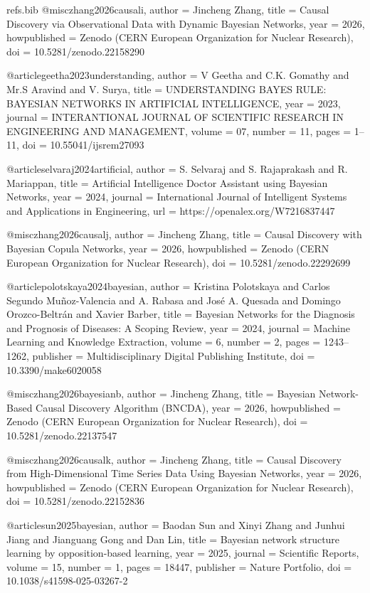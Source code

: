 \begin{filecontents*}[overwrite]{refs.bib}
@misc{zhang2026causali,
  author = {Jincheng Zhang},
  title = {{Causal Discovery via Observational Data with Dynamic Bayesian Networks}},
  year = {2026},
  howpublished = {Zenodo (CERN European Organization for Nuclear Research)},
  doi = {10.5281/zenodo.22158290}
}

@article{geetha2023understanding,
  author = {V Geetha and C.K. Gomathy and Mr.S Aravind and V. Surya},
  title = {{UNDERSTANDING BAYES RULE: BAYESIAN NETWORKS IN ARTIFICIAL INTELLIGENCE}},
  year = {2023},
  journal = {INTERANTIONAL JOURNAL OF SCIENTIFIC RESEARCH IN ENGINEERING AND MANAGEMENT},
  volume = {07},
  number = {11},
  pages = {1--11},
  doi = {10.55041/ijsrem27093}
}

@article{selvaraj2024artificial,
  author = {S. Selvaraj and S. Rajaprakash and R. Mariappan},
  title = {{Artificial Intelligence Doctor Assistant using Bayesian Networks}},
  year = {2024},
  journal = {International Journal of Intelligent Systems and Applications in Engineering},
  url = {https://openalex.org/W7216837447}
}

@misc{zhang2026causalj,
  author = {Jincheng Zhang},
  title = {{Causal Discovery with Bayesian Copula Networks}},
  year = {2026},
  howpublished = {Zenodo (CERN European Organization for Nuclear Research)},
  doi = {10.5281/zenodo.22292699}
}

@article{polotskaya2024bayesian,
  author = {Kristina Polotskaya and Carlos Segundo Mu{\~n}oz-Valencia and A. Rabasa and Jos{\'e} A. Quesada and Domingo Orozco{-}Beltr{\'a}n and Xavier Barber},
  title = {{Bayesian Networks for the Diagnosis and Prognosis of Diseases: A Scoping Review}},
  year = {2024},
  journal = {Machine Learning and Knowledge Extraction},
  volume = {6},
  number = {2},
  pages = {1243--1262},
  publisher = {Multidisciplinary Digital Publishing Institute},
  doi = {10.3390/make6020058}
}

@misc{zhang2026bayesianb,
  author = {Jincheng Zhang},
  title = {{Bayesian Network-Based Causal Discovery Algorithm (BNCDA)}},
  year = {2026},
  howpublished = {Zenodo (CERN European Organization for Nuclear Research)},
  doi = {10.5281/zenodo.22137547}
}

@misc{zhang2026causalk,
  author = {Jincheng Zhang},
  title = {{Causal Discovery from High-Dimensional Time Series Data Using Bayesian Networks}},
  year = {2026},
  howpublished = {Zenodo (CERN European Organization for Nuclear Research)},
  doi = {10.5281/zenodo.22152836}
}

@article{sun2025bayesian,
  author = {Baodan Sun and Xinyi Zhang and Junhui Jiang and Jianguang Gong and Dan Lin},
  title = {{Bayesian network structure learning by opposition-based learning}},
  year = {2025},
  journal = {Scientific Reports},
  volume = {15},
  number = {1},
  pages = {18447},
  publisher = {Nature Portfolio},
  doi = {10.1038/s41598-025-03267-2}
}


\end{filecontents*}
